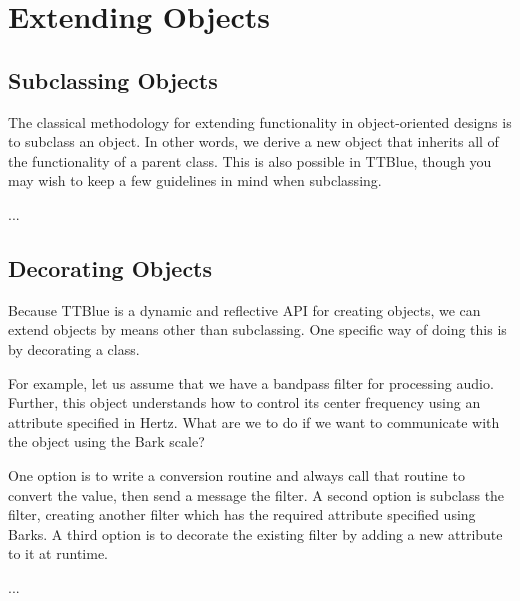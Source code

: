 \chapter{Extending Objects}

\section{Subclassing Objects}

The classical methodology for extending functionality in object-oriented designs is to subclass an object.
In other words, we derive a new object that inherits all of the functionality of a parent class.
This is also possible in TTBlue, though you may wish to keep a few guidelines in mind when subclassing.

...



\section{Decorating Objects}

Because TTBlue is a dynamic and reflective API for creating objects, we can extend objects by means other than subclassing.
One specific way of doing this is by decorating a class.

For example, let us assume that we have a bandpass filter for processing audio.
Further, this object understands how to control its center frequency using an attribute specified in Hertz.
What are we to do if we want to communicate with the object using the Bark scale?

One option is to write a conversion routine and always call that routine to convert the value, then send a message the filter.
A second option is subclass the filter, creating another filter which has the required attribute specified using Barks.
A third option is to decorate the existing filter by adding a new attribute to it at runtime.

...




